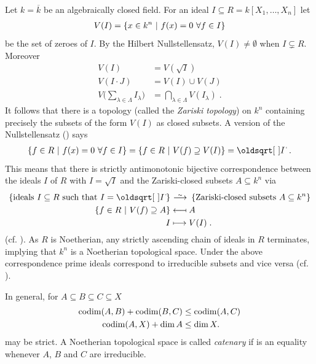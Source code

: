 \documentclass[a4paper,parskip=half,numbers=enddot, DIV=12]{scrreprt}
\begin{document}
\begin{example}
	Let $k =\overline{k}$ be an algebraically closed field. For an ideal $I\subseteq R = k[X_1,\ldots,X_n]$ let 
	\begin{align*}
	V(I) = \left\{x\in k^n\ \middle|\  f(x)=0\ \forall f\in I\right\}
	\end{align*}
	be the set of zeroes of $I$. By the Hilbert Nullstellensatz, $V(I) \neq \emptyset$ when $I\subsetneq R$. Moreover 
	\begin{align*}
	V(I)& = V\left(\sqrt{I}\right)\\
	V(I\cdot J ) &= V(I) \cup V(J)\\
	V\bigg(\sum_{\lambda\in\Lambda} I_\lambda\bigg) &=\bigcap_{\lambda\in\Lambda} V(I_\lambda)\;.
	\end{align*}
	It follows that there is a topology (called the \emph{Zariski topology}) on $k^n$ containing precisely the subsets of the form $V(I)$ as closed subsets. A version of the Nullstellensatz (\cite[Proposition~1.7.1]{alg1}) says
	\begin{align*}
	\left\{f\in R\st f(x) = 0\ \forall f\in I\right\} = \left\{f\in R\st V(f)\supseteq V(I)\right\} = \sqrt{I}\;.
	\end{align*}
	This means that there is strictly antimonotonic bijective correspondence between the ideals $I$ of $R$ with $I=\sqrt{I}$ and the Zariski-closed subsets $A\subseteq k^n$ via
	\begin{align*}
	\left\{\text{ideals }I\subseteq R\text{ such that }I=\sqrt I\right\}&\isomorphism\left\{\text{Zariski-closed subsets }A\subseteq k^n\right\}\\
	\left\{f\in R\st V(f)\supseteq A\right\} &\longmapsfrom A\\
	I&\longmapsto V(I)\;.
	\end{align*}
	(cf. \cite[Remark~2.1.1]{alg1}). As $R$ is Noetherian, any strictly ascending chain of ideals in $R$ terminates, implying that $k^n$ is a Noetherian topological space. Under the above correspondence prime ideals correspond to irreducible subsets and vice versa (cf. \cite[Proposition~2.1.2]{alg1}).  
\end{example}
\begin{rem}
	In general, for $A\subseteq B\subseteq C\subseteq X$
	\begin{align}\lbl{eq:codimIneq}
	\codim(A,B) +\codim(B,C) &\leq \codim(A,C) \\ 
	\codim(A,X)+\dim A &\leq \dim X.\lbl{eq:codimIneq2}
	\end{align}
	may be strict. A Noetherian topological space is called \emph{catenary} if  is an equality whenever $A$, $B$ and $C$ are irreducible.
\end{rem}
\end{document}
